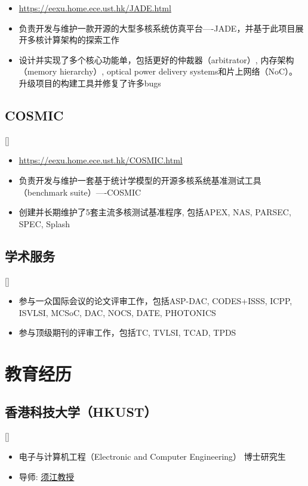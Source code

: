 \documentclass{mycv}
\begin{document}
\begin{itemize}
  \item \url{https://eexu.home.ece.ust.hk/JADE.html}
  \item 负责开发与维护一款开源的大型多核系统仿真平台----JADE，并基于此项目展开多核计算架构的探索工作
  \item 设计并实现了多个核心功能单，包括更好的仲裁器（arbitrator）, 内存架构（memory hierarchy）, optical power delivery systems和片上网络（NoC）。升级项目的构建工具并修复了许多bugs
\end{itemize}

\subsection{COSMIC}[]
\begin{positions}
\end{positions}

\begin{itemize}
	\item \url{https://eexu.home.ece.ust.hk/COSMIC.html}
	\item 负责开发与维护一套基于统计学模型的开源多核系统基准测试工具（benchmark suite）----COSMIC
	\item 创建并长期维护了5套主流多核测试基准程序, 包括APEX, NAS, PARSEC, SPEC, Splash
\end{itemize}

\subsection{学术服务}[]
\begin{positions}
\end{positions}

\begin{itemize}
	\item 参与一众国际会议的论文评审工作，包括ASP-DAC, CODES+ISSS, ICPP, ISVLSI, MCSoC, DAC, NOCS, DATE, PHOTONICS
	\item 参与顶级期刊的评审工作，包括TC, TVLSI, TCAD, TPDS
\end{itemize}

\section{教育经历}

\subsection{香港科技大学（HKUST）}[]
\vspace{-\parskip}%
\begin{itemize}[label={}]
	\item 电子与计算机工程（Electronic and Computer Engineering） 博士研究生 
	\item 导师: \href{https://eexu.home.ece.ust.hk/}{须江教授}
\end{itemize}
\end{document}
